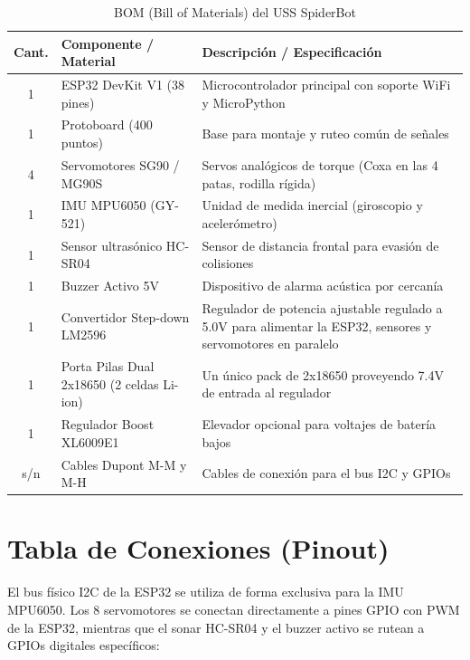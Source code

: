 \documentclass[12pt]{article}
\begin{document}
\begin{table}[htbp]
\centering
\caption{BOM (Bill of Materials) del USS SpiderBot}
\vspace{0.3cm}
\begin{tabularx}{\textwidth}{c l X}
\toprule
\textbf{Cant.} & \textbf{Componente / Material} & \textbf{Descripción / Especificación} \\
\midrule
1 & ESP32 DevKit V1 (38 pines) & Microcontrolador principal con soporte WiFi y MicroPython \\
1 & Protoboard (400 puntos) & Base para montaje y ruteo común de señales \\
4 & Servomotores SG90 / MG90S & Servos analógicos de torque (Coxa en las 4 patas, rodilla rígida) \\
1 & IMU MPU6050 (GY-521) & Unidad de medida inercial (giroscopio y acelerómetro) \\
1 & Sensor ultrasónico HC-SR04 & Sensor de distancia frontal para evasión de colisiones \\
1 & Buzzer Activo 5V & Dispositivo de alarma acústica por cercanía \\
1 & Convertidor Step-down LM2596 & Regulador de potencia ajustable regulado a 5.0V para alimentar la ESP32, sensores y servomotores en paralelo \\
1 & Porta Pilas Dual 2x18650 (2 celdas Li-ion) & Un único pack de 2x18650 proveyendo 7.4V de entrada al regulador \\
1 & Regulador Boost XL6009E1 & Elevador opcional para voltajes de batería bajos \\
s/n & Cables Dupont M-M y M-H & Cables de conexión para el bus I2C y GPIOs \\
\bottomrule
\end{tabularx}
\end{table}

\section{Tabla de Conexiones (Pinout)}
El bus físico I2C de la ESP32 se utiliza de forma exclusiva para la IMU MPU6050. Los 8 servomotores se conectan directamente a pines GPIO con PWM de la ESP32, mientras que el sonar HC-SR04 y el buzzer activo se rutean a GPIOs digitales específicos:
\end{document}
